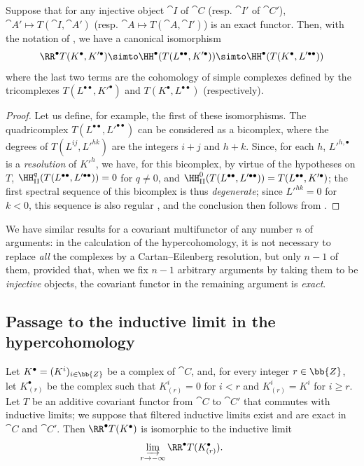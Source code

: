\begin{proposition}[11.4.7]
\label{0.11.4.7}
Suppose that for any injective object $\cat{I}$ of $\cat{C}$ (resp. $\cat{I'}$ of $\cat{C}'$), $\cat{A'}\mapsto T(\cat{I}, \cat{A'})$ (resp. $\cat{A}\mapsto T(\cat{A}, \cat{I'})$) is an exact functor.
Then, with the notation of , we have a canonical isomorphism
\[
  \RR^\bullet T(K^\bullet, K'^\bullet) \simto \HH^\bullet(T(L^{\bullet\bullet}, K'^\bullet)) \simto \HH^\bullet(T(K^\bullet, L'^{\bullet\bullet})) 
\]
where the last two terms are the cohomology of simple complexes defined by the tricomplexes $T(L^{\bullet\bullet}, K'^\bullet)$ and $T(K^\bullet, L^{\bullet\bullet})$ (respectively).
\end{proposition}

\begin{proof}
Let us define, for example, the first of these isomorphisms.
The quadricomplex $T(L^{\bullet\bullet}, L'^{\bullet\bullet})$ can be considered as a bicomplex, where the degrees of $T(L^{ij}, L'^{hk})$ are the integers $i+j$ and $h+k$.
Since, for each $h$, ${L'}^{h,\bullet}$ is a \emph{resolution} of ${K'}^h$, we have, for this bicomplex, by virtue of the hypotheses on $T$, $\HH_\mathrm{II}^q(T(L^{\bullet\bullet}, L'^{\bullet\bullet}))=0$ for $q\neq 0$, and $\HH_\mathrm{II}^0(T(L^{\bullet\bullet}, L'^{\bullet\bullet})) = T(L^{\bullet\bullet}, K'^\bullet)$;
the first spectral sequence of this bicomplex is thus \emph{degenerate};
since $L'^{hk}=0$ for $k<0$, this sequence is also regular , and the conclusion then follows from .
\end{proof}

We have similar results for a covariant multifunctor of any number $n$ of arguments: in the calculation of the hypercohomology, it is not necessary to replace \emph{all} the complexes 
by a Cartan--Eilenberg resolution, but only $n-1$ of them, provided that, when we fix $n-1$ arbitrary arguments by taking them to be \emph{injective} objects, the covariant functor in the remaining argument is \emph{exact}.


\subsection{Passage to the inductive limit in the hypercohomology}
\label{subsection:0.11.5}

\begin{lemma}[11.5.1]
\label{0.11.5.1}
Let $K^\bullet=(K^i)_{i\in\bb{Z}}$ be a complex of $\cat{C}$, and, for every integer $r\in\bb{Z}$, let $K^\bullet_{(r)}$ be the complex such that $K^i_{(r)}=0$ for $i<r$ and $K^i_{(r)}=K^i$ for $i\geq r$.
Let $T$ be an additive covariant functor
from $\cat{C}$ to $\cat{C}'$ that commutes with inductive limits; we suppose that filtered inductive limits exist and are exact in $\cat{C}$ and $\cat{C}'$.
Then $\RR^\bullet T(K^\bullet)$ is isomorphic to the inductive limit
\[
  \varinjlim_{r\to-\infty}\RR^\bullet T(K^\bullet_{(r)}).
\]
\end{lemma}

